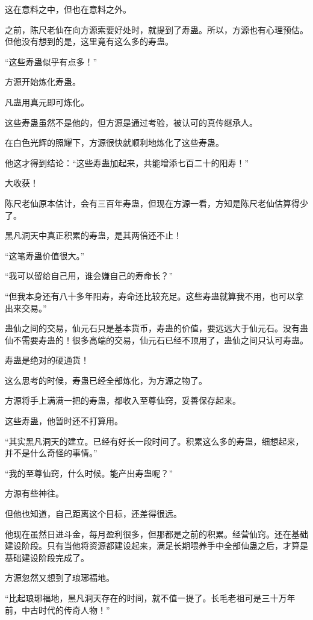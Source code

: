 \begin{this_body}
这在意料之中，但也在意料之外。

之前，陈尺老仙在向方源索要好处时，就提到了寿蛊。所以，方源也有心理预估。但他没有想到的是，这里竟有这么多的寿蛊。

“这些寿蛊似乎有点多！”

方源开始炼化寿蛊。

凡蛊用真元即可炼化。

这些寿蛊虽然不是他的，但方源是通过考验，被认可的真传继承人。

在白色光辉的照耀下，方源很快就顺利地炼化了这些寿蛊。

他这才得到结论：“这些寿蛊加起来，共能增添七百二十的阳寿！”

大收获！

陈尺老仙原本估计，会有三百年寿蛊，但现在方源一看，方知是陈尺老仙估算得少了。

黑凡洞天中真正积累的寿蛊，是其两倍还不止！

“这笔寿蛊价值很大。”

“我可以留给自己用，谁会嫌自己的寿命长？”

“但我本身还有八十多年阳寿，寿命还比较充足。这些寿蛊就算我不用，也可以拿出来交易。”

蛊仙之间的交易，仙元石只是基本货币，寿蛊的价值，要远远大于仙元石。没有蛊仙不需要寿蛊的！很多高端的交易，仙元石已经不顶用了，蛊仙之间只认可寿蛊。

寿蛊是绝对的硬通货！

这么思考的时候，寿蛊已经全部炼化，为方源之物了。

方源将手上满满一把的寿蛊，都收入至尊仙窍，妥善保存起来。

这些寿蛊，他暂时还不打算用。

“其实黑凡洞天的建立。已经有好长一段时间了。积累这么多的寿蛊，细想起来，并不是什么奇怪的事情。”

“我的至尊仙窍，什么时候。能产出寿蛊呢？”

方源有些神往。

但他也知道，自己距离这个目标，还差得很远。

他现在虽然日进斗金，每月盈利很多，但那都是之前的积累。经营仙窍。还在基础建设阶段。只有当他将资源都建设起来，满足长期喂养手中全部仙蛊之后，才算是基础建设阶段完成了。

方源忽然又想到了琅琊福地。

“比起琅琊福地，黑凡洞天存在的时间，就不值一提了。长毛老祖可是三十万年前，中古时代的传奇人物！”


\end{this_body}
